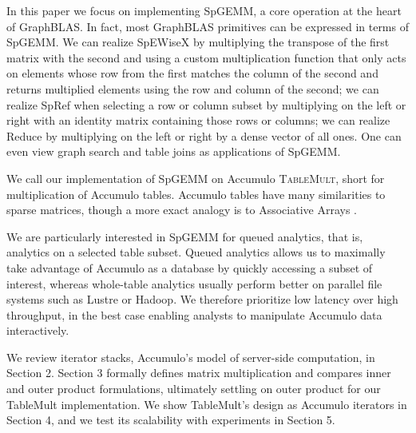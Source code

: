 In this paper we focus on implementing SpGEMM, a core operation at the heart of GraphBLAS.
In fact, most GraphBLAS primitives can be expressed in terms of SpGEMM.
We can realize SpEWiseX by multiplying the transpose of the first matrix with the second
and using a custom multiplication function that only acts on elements whose row from the first 
matches the column of the second and returns multiplied elements using the row and column of the second;
we can realize SpRef when selecting a row or column subset by multiplying on the left or right with an identity matrix 
containing those rows or columns;
we can realize Reduce by multiplying on the left or right %
by a dense vector of all ones.
One can even view graph search \cite{kepner2011graph} and table joins \cite{x} as applications of SpGEMM.

We call our implementation of SpGEMM on Accumulo \textsc{TableMult}, short for multiplication of Accumulo tables.
Accumulo tables have many similarities to sparse matrices, though a more exact analogy is to Associative Arrays 
\cite{kepner2014gabb}.

We are particularly interested in SpGEMM for queued analytics, that is, analytics on a selected table subset.  
Queued analytics allows us to maximally take advantage of Accumulo as a database 
by quickly accessing a subset of interest, 
whereas whole-table analytics usually perform better on parallel file systems such as Lustre or Hadoop.
We therefore prioritize low latency over high throughput, %
in the best case enabling analysts to manipulate Accumulo data interactively.


We review iterator stacks, Accumulo's model of server-side computation, in Section 2.
Section 3 formally defines matrix multiplication and compares inner and outer product formulations,
ultimately settling on outer product for our TableMult implementation.
We show TableMult's design as Accumulo iterators in Section 4,
and we test its scalability with experiments in Section 5.



